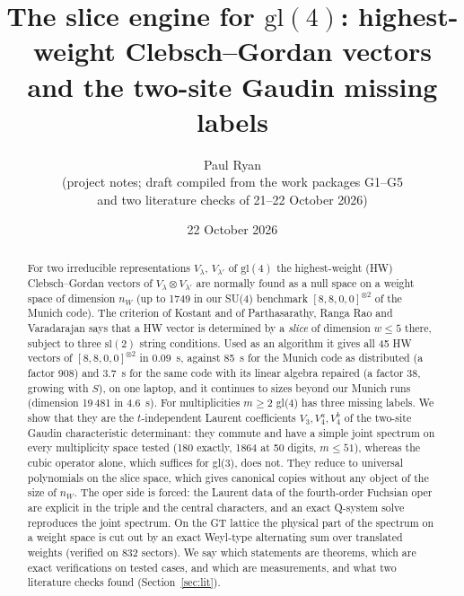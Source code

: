 \documentclass[11pt]{article}
\title{\vspace{-1.6cm}The slice engine for $\mathrm{gl}(4)$: highest-weight Clebsch--Gordan vectors and the two-site Gaudin missing labels}
\author{Paul Ryan\\ \small (project notes; draft compiled from the work packages G1--G5\\ and two literature checks of 21--22 October 2026)}
\date{22 October 2026}
\makeatletter
\renewcommand\section{\@startsection{section}{1}{\z@}{-2.6ex \@plus -1ex \@minus -.2ex}{1.0ex \@plus .2ex}{\normalfont\large\bfseries}}
\makeatother
\begin{document}
\maketitle

\begin{abstract}
For two irreducible representations $V_\lambda$, $V_{\lambda'}$ of $\mathrm{gl}(4)$ the highest-weight (HW) Clebsch--Gordan vectors of $V_\lambda\otimes V_{\lambda'}$ are normally found as a null space on a weight space of dimension $n_W$ (up to 1749 in our SU(4) benchmark $[8,8,0,0]^{\otimes2}$ of the Munich code).
The criterion of Kostant and of Parthasarathy, Ranga Rao and Varadarajan says that a HW vector is determined by a \emph{slice} of dimension $w\le5$ there, subject to three $\mathrm{sl}(2)$ string conditions.
Used as an algorithm it gives all 45 HW vectors of $[8,8,0,0]^{\otimes2}$ in 0.09~s, against 85~s for the Munich code as distributed (a factor 908) and 3.7~s for the same code with its linear algebra repaired (a factor 38, growing with $S$), on one laptop, and it continues to sizes beyond our Munich runs (dimension 19\,481 in 4.6~s).
For multiplicities $m\ge2$ gl(4) has three missing labels.
We show that they are the $t$-independent Laurent coefficients $V_3,V_4^{a},V_4^{b}$ of the two-site Gaudin characteristic determinant: they commute and have a simple joint spectrum on every multiplicity space tested (180 exactly, 1864 at 50 digits, $m\le51$), whereas the cubic operator alone, which suffices for gl(3), does not.
They reduce to universal polynomials on the slice space, which gives canonical copies without any object of the size of $n_W$.
The oper side is forced: the Laurent data of the fourth-order Fuchsian oper are explicit in the triple and the central characters, and an exact Q-system solve reproduces the joint spectrum.
On the GT lattice the physical part of the spectrum on a weight space is cut out by an exact Weyl-type alternating sum over translated weights (verified on 832 sectors).
We say which statements are theorems, which are exact verifications on tested cases, and which are measurements, and what two literature checks found (Section~\ref{sec:lit}).
\end{abstract}

\section{Punchline}\label{sec:punch}
\end{document}
